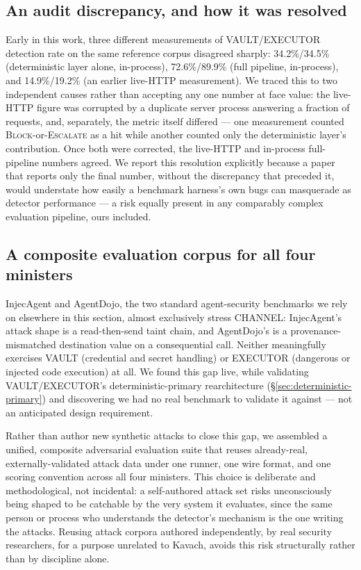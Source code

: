 \documentclass[sigconf,anonymous,review]{acmart}
\begin{document}
\subsection{An audit discrepancy, and how it was resolved}
\label{sec:audit-resolution}
Early in this work, three different measurements of VAULT/EXECUTOR detection
rate on the same reference corpus disagreed sharply: 34.2\%/34.5\%
(deterministic layer alone, in-process), 72.6\%/89.9\% (full pipeline,
in-process), and 14.9\%/19.2\% (an earlier live-HTTP measurement). We traced
this to two independent causes rather than accepting any one number at face
value: the live-HTTP figure was corrupted by a duplicate server process
answering a fraction of requests, and, separately, the metric itself
differed --- one measurement counted \textsc{Block}-or-\textsc{Escalate} as
a hit while another counted only the deterministic layer's contribution.
Once both were corrected, the live-HTTP and in-process full-pipeline numbers
agreed. We report this resolution explicitly because a paper that reports
only the final number, without the discrepancy that preceded it, would
understate how easily a benchmark harness's own bugs can masquerade as
detector performance --- a risk equally present in any comparably complex
evaluation pipeline, ours included.

\subsection{A composite evaluation corpus for all four ministers}
\label{sec:kavach-pb}
InjecAgent and AgentDojo, the two standard agent-security benchmarks we rely
on elsewhere in this section, almost exclusively stress CHANNEL: InjecAgent's
attack shape is a read-then-send taint chain, and AgentDojo's is a
provenance-mismatched destination value on a consequential call. Neither
meaningfully exercises VAULT (credential and secret handling) or EXECUTOR
(dangerous or injected code execution) at all. We found this gap live, while
validating VAULT/EXECUTOR's deterministic-primary rearchitecture
(\S\ref{sec:deterministic-primary}) and discovering we had no real benchmark
to validate it against --- not an anticipated design requirement.

Rather than author new synthetic attacks to close this gap, we assembled
a unified, composite
adversarial evaluation suite that reuses already-real, externally-validated
attack data under one runner, one wire format, and one scoring convention
across all four ministers. This choice is deliberate and methodological, not
incidental: a self-authored attack set risks unconsciously being shaped to be
catchable by the very system it evaluates, since the same person or process
who understands the detector's mechanism is the one writing the attacks.
Reusing attack corpora authored independently, by real security researchers,
for a purpose unrelated to Kavach, avoids this risk structurally rather than
by discipline alone.
\end{document}
